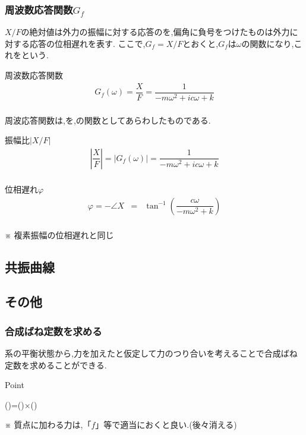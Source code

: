 \documentclass[a4paper]{jsarticle}
\begin{document}
\subsubsection{周波数応答関数$G_f$}
$X/F$の絶対値は外力の振幅に対する応答のを,偏角に負号をつけたものは外力に対する応答の位相遅れを表す.
ここで,$G_f=X/F$とおくと,$G_f$は$\omega$の関数になり,これをという.
\begin{itembox}[l]{周波数応答関数}
    \begin{eqnarray*}
        G_f\left(\omega\right)=\dfrac{X}{F}=\dfrac{1}{-m\omega^2+ic\omega +k}\\
    \end{eqnarray*}
\end{itembox}
周波応答関数は,を,の関数としてあらわしたものである.
\begin{itembox}[l]{振幅比$|X/F|$}
    \begin{eqnarray*}
        \left|\dfrac{X}{F}\right|=|G_f\left(\omega\right)|=\dfrac{1}{-m\omega^2+ic\omega+k}\\
    \end{eqnarray*}
\end{itembox}
\begin{itembox}[l]{位相遅れ$\varphi$}
    \begin{eqnarray*}
        \varphi=-\angle X &=&\tan^{-1}\left(\dfrac{c\omega}{-m\omega^2+k}\right)\\
    \end{eqnarray*}
    \begin{center}
        ※ 複素振幅の位相遅れと同じ
    \end{center}
\end{itembox}
\subsection{共振曲線}

\subsection{その他}
\subsubsection{合成ばね定数を求める}
系の平衡状態から,力を加えたと仮定して力のつり合いを考えることで合成ばね定数を求めることができる.
\begin{itembox}[l]{Point}
    \begin{center}
        ()\quad=\quad()\quad×\quad()
    \end{center}
\end{itembox}
※ 質点に加わる力は,「$f$」等で適当におくと良い.(後々消える)
\newpage
\end{document}
